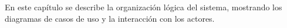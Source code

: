 
	En este capítulo se describe la organización lógica del sistema, mostrando los diagramas de casos de uso y la interacción con los actores. 
	
